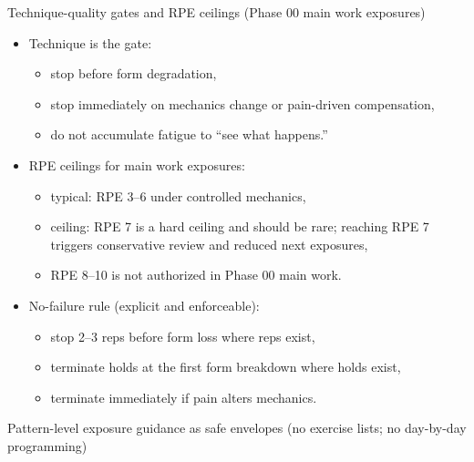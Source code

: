 \documentclass[10pt]{article}
\begin{document}
Technique-quality gates and RPE ceilings (Phase 00 main work exposures)

\begin{itemize}
\item Technique is the gate:
  \begin{itemize}
  \item stop before form degradation,
  \item stop immediately on mechanics change or pain-driven compensation,
  \item do not accumulate fatigue to “see what happens.”
  \end{itemize}
\item RPE ceilings for main work exposures:
  \begin{itemize}
  \item typical: RPE 3–6 under controlled mechanics,
  \item ceiling: RPE 7 is a hard ceiling and should be rare; reaching RPE 7 triggers conservative review and reduced next exposures,
  \item RPE 8–10 is not authorized in Phase 00 main work.
  \end{itemize}
\item No-failure rule (explicit and enforceable):
  \begin{itemize}
  \item stop 2–3 reps before form loss where reps exist,
  \item terminate holds at the first form breakdown where holds exist,
  \item terminate immediately if pain alters mechanics.
  \end{itemize}
\end{itemize}

Pattern-level exposure guidance as safe envelopes (no exercise lists; no day-by-day programming)
\end{document}
